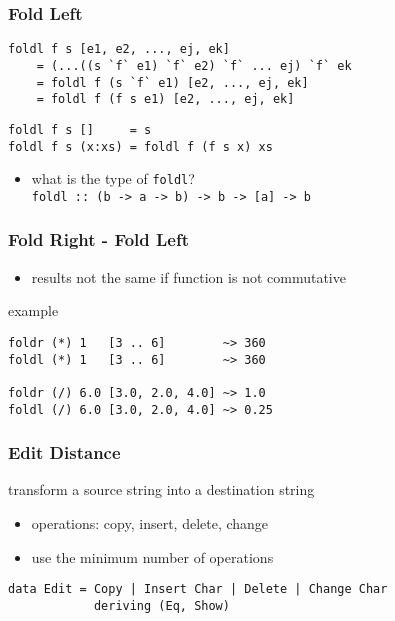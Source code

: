 \documentclass[dvipsnames]{beamer}
\theoremstyle{plain}
\begin{document}
\begin{frame}[fragile]
  \frametitle{Fold Left}

  \begin{block}{}
    \begin{lstlisting}
foldl f s [e1, e2, ..., ej, ek]
    = (...((s `f` e1) `f` e2) `f` ... ej) `f` ek
    = foldl f (s `f` e1) [e2, ..., ej, ek]
    = foldl f (f s e1) [e2, ..., ej, ek]
    \end{lstlisting}
  \end{block}

  \pause
  \begin{exampleblock}{}
    \begin{lstlisting}[deletekeywords={foldl}]
foldl f s []     = s
foldl f s (x:xs) = foldl f (f s x) xs
    \end{lstlisting}
  \end{exampleblock}

  \pause
  \begin{itemize}
    \item what is the type of \lstinline|foldl|?\\
      \lstinline|foldl :: (b -> a -> b) -> b -> [a] -> b|
  \end{itemize}
\end{frame}

\begin{frame}[fragile]
  \frametitle{Fold Right - Fold Left}

  \begin{itemize}
    \item results not the same if function is not commutative
  \end{itemize}

  \begin{exampleblock}{example}
    \begin{lstlisting}
foldr (*) 1   [3 .. 6]        ~> 360
foldl (*) 1   [3 .. 6]        ~> 360

foldr (/) 6.0 [3.0, 2.0, 4.0] ~> 1.0
foldl (/) 6.0 [3.0, 2.0, 4.0] ~> 0.25
    \end{lstlisting}
  \end{exampleblock}
\end{frame}

\begin{frame}[fragile]
  \frametitle{Edit Distance}

  \begin{exampleblock}{transform a source string into a destination string}
    \begin{itemize}
      \item operations: copy, insert, delete, change
      \item use the minimum number of operations
    \end{itemize}

    \begin{lstlisting}
data Edit = Copy | Insert Char | Delete | Change Char
            deriving (Eq, Show)
    \end{lstlisting}
  \end{exampleblock}
\end{frame}
\end{document}
